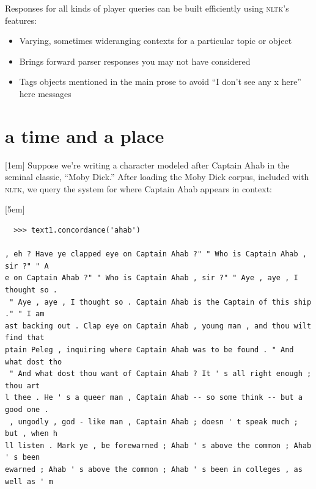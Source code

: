 
Responses for all kinds of player queries can be 
built efficiently using \textsc{nltk}'s features:
\begin{itemize}
  \setlength\itemsep{0em}
  \item{Varying, sometimes wide\textendash ranging contexts for a particular topic or object}
  \item{Brings forward parser responses you may not have considered}
  \item{Tags objects mentioned in the main prose to avoid ``I don't see any x
      here'' here messages}
\end{itemize}
\section{a time and a place}
[1em]
Suppose we're writing a character modeled after Captain Ahab in the seminal
classic, ``Moby Dick.'' After loading the Moby Dick corpus, included with
\textsc{nltk}, we query the system for where Captain Ahab appears in context:
\pagebreak

[5em]
\begin{lstlisting}
  >>> text1.concordance('ahab')

, eh ? Have ye clapped eye on Captain Ahab ?" " Who is Captain Ahab , sir ?" " A
e on Captain Ahab ?" " Who is Captain Ahab , sir ?" " Aye , aye , I thought so .
 " Aye , aye , I thought so . Captain Ahab is the Captain of this ship ." " I am
ast backing out . Clap eye on Captain Ahab , young man , and thou wilt find that
ptain Peleg , inquiring where Captain Ahab was to be found . " And what dost tho
 " And what dost thou want of Captain Ahab ? It ' s all right enough ; thou art
l thee . He ' s a queer man , Captain Ahab -- so some think -- but a good one .
 , ungodly , god - like man , Captain Ahab ; doesn ' t speak much ; but , when h
ll listen . Mark ye , be forewarned ; Ahab ' s above the common ; Ahab ' s been
ewarned ; Ahab ' s above the common ; Ahab ' s been in colleges , as well as ' m
\end{lstlisting}

